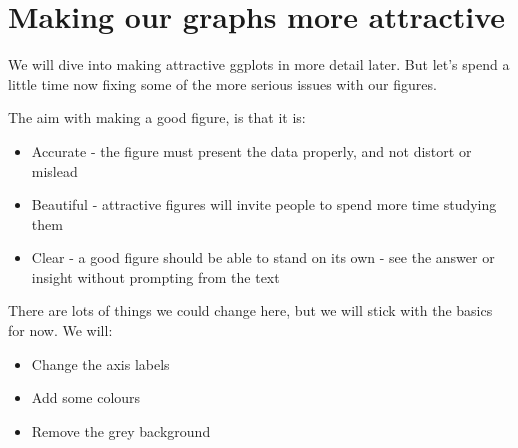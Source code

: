 \documentclass[
]{book}
\begin{document}
\hypertarget{making-our-graphs-more-attractive}{%
\section{Making our graphs more attractive}\label{making-our-graphs-more-attractive}}

We will dive into making attractive ggplots in more detail later. But let's spend a little time now fixing some of the more serious issues with our figures.

The aim with making a good figure, is that it is:

\begin{itemize}
\item
  Accurate - the figure must present the data properly, and not distort or mislead
\item
  Beautiful - attractive figures will invite people to spend more time studying them
\item
  Clear - a good figure should be able to stand on its own - see the answer or insight without prompting from the text
\end{itemize}

There are lots of things we could change here, but we will stick with the basics for now. We will:

\begin{itemize}
\item
  Change the axis labels
\item
  Add some colours
\item
  Remove the grey background
\end{itemize}
\end{document}
